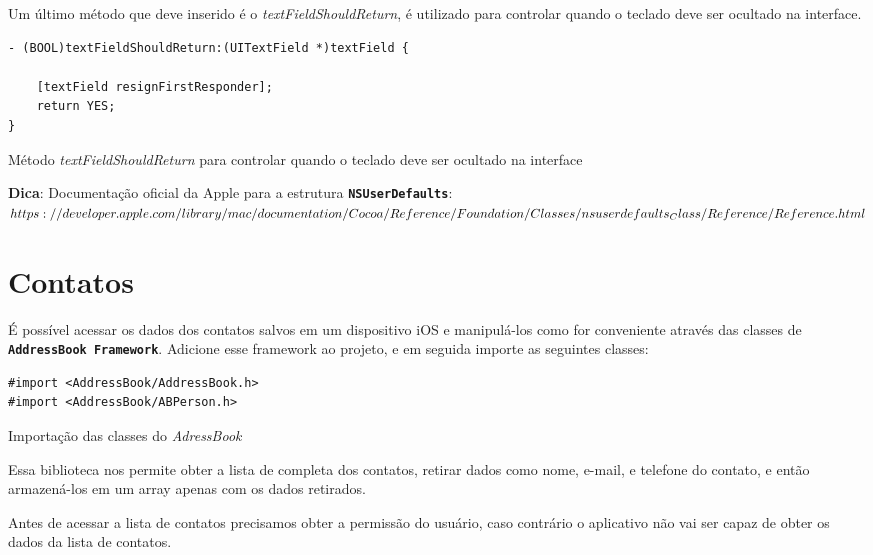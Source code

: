 \documentclass[a4paper,12pt,brazil,oneside]{book}
\begin{document}
Um último método que deve inserido é o \emph{textFieldShouldReturn}, é utilizado para controlar quando o teclado deve ser ocultado na interface.

\begin{listing}[H]
\begin{verbatim}
- (BOOL)textFieldShouldReturn:(UITextField *)textField {
    
    [textField resignFirstResponder];
    return YES;
}
\end{verbatim}
\caption{Método \emph{textFieldShouldReturn} para controlar quando o teclado deve ser ocultado na interface}
\end{listing}

\begin{framed}

\textbf{Dica}: Documentação oficial da Apple para a estrutura \texttt{\textbf{NSUserDefaults}}:\\
\(https://developer.apple.com/library/mac/documentation/Cocoa/Reference\\/Foundation/Classes/nsuserdefaults_Class/Reference/Reference.html
\)
\end{framed}

\section{Contatos}

É possível acessar os dados dos contatos salvos em um dispositivo iOS e manipulá-los como for conveniente através das classes de \texttt{\textbf{AddressBook Framework}}. Adicione esse framework ao projeto, e em seguida importe as seguintes classes:

\begin{listing}[H]
\begin{verbatim}
#import <AddressBook/AddressBook.h>
#import <AddressBook/ABPerson.h>
\end{verbatim}
\caption{Importação das classes do \emph{AdressBook}}
\end{listing}


Essa biblioteca nos permite obter a lista de completa dos contatos, retirar dados como nome, e-mail, e telefone do contato, e então armazená-los em um array apenas com os dados retirados.
 
Antes de acessar a lista de contatos precisamos obter a permissão do usuário, caso contrário o aplicativo não vai ser capaz de obter os dados da lista de contatos.
\end{document}
